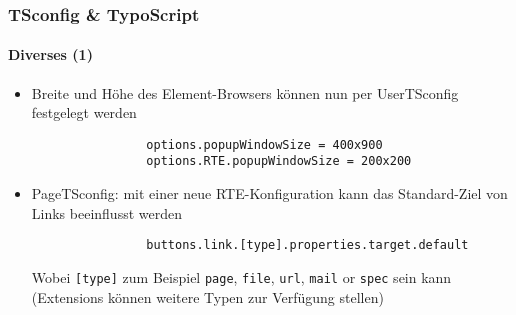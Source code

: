 \begin{frame}[fragile]
	\frametitle{TSconfig \& TypoScript}
	\framesubtitle{Diverses (1)}

	\begin{itemize}
		\item Breite und Höhe des Element-Browsers können nun per UserTSconfig festgelegt werden

			\begin{lstlisting}
				options.popupWindowSize = 400x900
				options.RTE.popupWindowSize = 200x200
			\end{lstlisting}


		\item PageTSconfig: mit einer neue RTE-Konfiguration kann das Standard-Ziel von Links beeinflusst werden

			\begin{lstlisting}
				buttons.link.[type].properties.target.default
			\end{lstlisting}

			Wobei \texttt{[type]} zum Beispiel \texttt{page}, \texttt{file}, \texttt{url}, \texttt{mail} or \texttt{spec} sein kann\newline
			(Extensions können weitere Typen zur Verfügung stellen)

	\end{itemize}

\end{frame}


